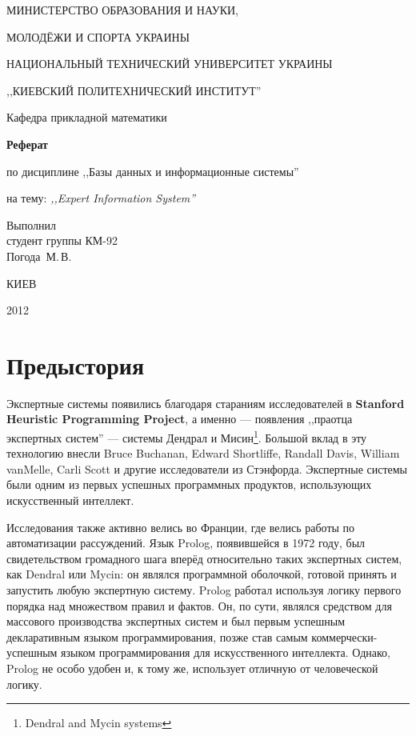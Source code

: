 \documentclass[a4paper,12pt,notitlepage,pdftex,headsepline]{scrartcl}
\begin{document}
\begin{titlepage}
  \begin{center}
    \large
    \MakeUppercase{Министерство образования и науки,}

    \MakeUppercase{молодёжи и спорта Украины}

    \MakeUppercase{Национальный технический университет Украины}

    \MakeUppercase{,,Киевский политехнический институт''}

    \addvspace{6pt}

    \normalsize
    Кафедра прикладной математики

    \vfill

    \textbf{Реферат}

    по дисциплине ,,Базы данных и информационные системы''

    на тему: \textit{,,Expert Information System''}
  \end{center}

  \vfill

  Выполнил\\
  студент группы КМ-92\\
  Погода~М.\,В.\\
  \vfill

  \begin{center}
    КИЕВ

    2012
  \end{center}
\end{titlepage}

\tableofcontents
\clearpage

\section{Предыстория}
  Экспертные системы появились благодаря стараниям исследователей в
  \textbf{Stanford Heuristic Programming Project}, а именно --- появления
  ,,праотца экспертных систем'' --- системы Дендрал и Мисин\footnote{Dendral
  and Mycin systems}.
  Большой вклад в эту технологию внесли Bruce Buchanan, Edward Shortliffe,
  Randall Davis, William vanMelle, Carli Scott и другие исследователи из
  Стэнфорда.
  Экспертные системы были одним из первых успешных программных продуктов,
  использующих искусственный интеллект.

  Исследования также активно велись во Франции, где велись работы по
  автоматизации рассуждений.
  Язык Prolog,  появившейся в 1972 году, был свидетельством громадного шага
  вперёд относительно таких экспертных систем, как Dendral или Mycin: он
  являлся программной оболочкой, готовой принять и запустить любую экспертную
  систему.
  Prolog работал используя логику первого порядка над множеством правил и
  фактов.
  Он, по сути, являлся средством для массового производства экспертных систем
  и был первым успешным декларативным языком программирования, позже став
  самым коммерчески-успешным языком программирования для искусственного
  интеллекта.
  Однако, Prolog не особо удобен и, к тому же, использует отличную от
  человеческой логику.
\end{document}
